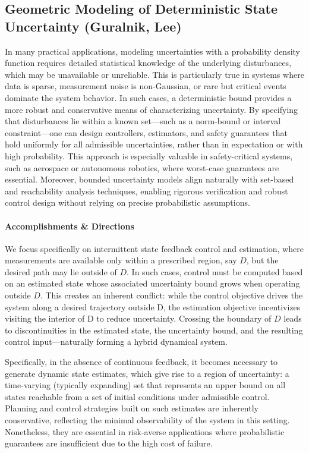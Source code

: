 \documentclass[letterpaper,11pt]{article}
\begin{document}
\subsection{Geometric Modeling of Deterministic State Uncertainty (Guralnik, Lee)}\label{sec:deterministic_uncertainty}

In many practical applications, modeling uncertainties with a probability density function requires detailed statistical knowledge of the underlying disturbances, which may be unavailable or unreliable.
This is particularly true in systems where data is sparse, measurement noise is non-Gaussian, or rare but critical events dominate the system behavior.
In such cases, a deterministic bound provides a more robust and conservative means of characterizing uncertainty.
By specifying that disturbances lie within a known set—such as a norm-bound or interval constraint—one can design controllers, estimators, and safety guarantees that hold uniformly for all admissible uncertainties, rather than in expectation or with high probability.
This approach is especially valuable in safety-critical systems, such as aerospace or autonomous robotics, where worst-case guarantees are essential.
Moreover, bounded uncertainty models align naturally with set-based and reachability analysis techniques, enabling rigorous verification and robust control design without relying on precise probabilistic assumptions.

\paragraph{Accomplishments \& Directions}

We focus specifically on intermittent state feedback control and estimation, where measurements are available only within a prescribed region, say $D$, but the desired path may lie outside of $D$.
In such cases, control must be computed based on an estimated state whose associated uncertainty bound grows when operating outside $D$.
This creates an inherent conflict: while the control objective drives the system along a desired trajectory outside D, the estimation objective incentivizes visiting the interior of D to reduce uncertainty.
Crossing the boundary of $D$ leads to discontinuities in the estimated state, the uncertainty bound, and the resulting control input—naturally forming a hybrid dynamical system.

Specifically, in the absence of continuous feedback, it becomes necessary to generate dynamic state estimates, which give rise to a region of uncertainty: a time-varying (typically expanding) set that represents an upper bound on all states reachable from a set of initial conditions under admissible control.
Planning and control strategies built on such estimates are inherently conservative, reflecting the minimal observability of the system in this setting.
Nonetheless, they are essential in risk-averse applications where probabilistic guarantees are insufficient due to the high cost of failure.
\end{document}
